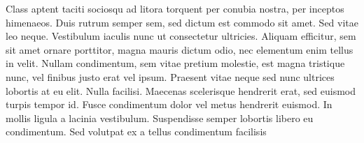 
Class aptent taciti sociosqu ad litora torquent per conubia nostra, per inceptos himenaeos. Duis rutrum semper sem, sed dictum est commodo sit amet. Sed vitae leo neque. Vestibulum iaculis nunc ut consectetur ultricies. Aliquam efficitur, sem sit amet ornare porttitor, magna mauris dictum odio, nec elementum enim tellus in velit. Nullam condimentum, sem vitae pretium molestie, est magna tristique nunc, vel finibus justo erat vel ipsum. Praesent vitae neque sed nunc ultrices lobortis at eu elit. Nulla facilisi. Maecenas scelerisque hendrerit erat, sed euismod turpis tempor id. Fusce condimentum dolor vel metus hendrerit euismod. In mollis ligula a lacinia vestibulum. Suspendisse semper lobortis libero eu condimentum. Sed volutpat ex a tellus condimentum facilisis

